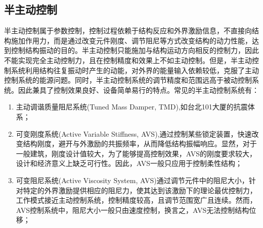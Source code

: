 \subsection{半主动控制}
半主动控制属于参数控制，控制过程依赖于结构反应和外界激励信息，不直接向结构施加作用力，而是通过改变元件刚度、调节阻尼等方式改变结构的动力性能，达到控制结构振动的目的。半主动控制只能施加与结构运动方向相反的控制力，因此不能实现完全主动控制力，且在控制精度和效果上不如主动控制。但是，半主动控制系统利用结构往复振动时产生的动能，对外界的能量输入依赖较低，克服了主动控制系统的能源问题。同时，半主动控制系统的调节精度和范围远高于被动控制系统。因此兼具了控制效果良好、设备简单易行的特点。常见的半主动控制系统有：
\begin{enumerate}
\item 主动调谐质量阻尼系统(Tuned Mass Damper, TMD),如台北101大厦的抗震体系；
\item 可变刚度系统(Active Variable Stiffness, AVS),通过控制某些锁定装置，快速改变结构刚度，避开与外激励的共振频率，从而降低结构振幅响应。\cite{Lijing2006}显然，对于一般建筑，刚度设计值较大，为了能够提高控制效果，AVS的刚度要求较大，设计和经济意义上缺乏可行性。因此，AVS一般只应用于控制柔性结构；
\item 可变阻尼系统(Active Viscosity System, AVS)通过调节元件中的阻尼大小，针对特定的外界激励提供相应的阻尼力，使其达到该激励下的理论最优控制力，工作模式接近主动控制系统，控制精度较高，且调节范围宽广且连续。然而，AVS控制系统中，阻尼大小一般只由速度控制，换言之，AVS无法控制结构位移；
\end{enumerate}